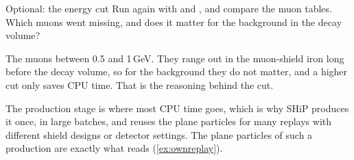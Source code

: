 \begin{exercise}[colback=white]{Optional: the energy cut}
Run again with  and ,
and compare the muon tables. Which muons went missing, and does it matter for
the background in the decay volume?
\end{exercise}

\begin{solution}
The muons between 0.5 and 1\,GeV. They range out in the muon-shield iron long
before the decay volume, so for the background they do not matter, and a
higher cut only saves CPU time. That is the reasoning behind the cut.
\end{solution}

\begin{note}
The production stage is where most CPU time goes, which is why SHiP produces
it once, in large batches, and reuses the plane particles for many replays
with different shield designs or detector settings. The plane particles of
such a production are exactly what  reads
(\cref{ex:ownreplay}).
\end{note}
